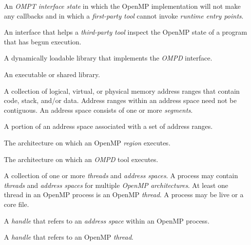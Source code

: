\glossarydefstart
An \emph{OMPT interface state} in which the OpenMP implementation will 
not make any callbacks and in which a \emph{first-party tool} cannot 
invoke \emph{runtime entry points}.
\glossarydefend

\glossarydefstart
An interface that helps a \emph{third-party tool} inspect the OpenMP state 
of a program that has begun execution.
\glossarydefend

\glossarydefstart
A dynamically loadable library that implements the \emph{OMPD} interface.
\glossarydefend

\glossarydefstart
An executable or shared library.
\glossarydefend

\glossarydefstart
A collection of logical, virtual, or physical memory address ranges 
that contain code, stack, and/or data. 
Address ranges within an address space need not be contiguous.  
An address space consists of one or more \emph{segments}.
\glossarydefend

\glossarydefstart
A portion of an address space associated with a set of address ranges.
\glossarydefend

\begin{comment}
\glossaryterm{architecture}
\glossarydefstart
A combination of the processor and the Application Binary Interface (ABI) used by
threads and address spaces.
\glossarydefend
\end{comment}

\glossarydefstart
The architecture on which an OpenMP \emph{region} executes.
\glossarydefend

\glossarydefstart
The architecture on which an \emph{OMPD} tool executes.
\glossarydefend

\glossarydefstart
A collection of one or more \emph{threads} and \emph{address spaces}. 
A process may contain \emph{threads} and \emph{address spaces} for 
multiple \emph{OpenMP architectures}. At least one thread in 
an OpenMP process is an OpenMP \emph{thread}.
A process may be live or a core file.
\glossarydefend

\glossarydefstart
A \emph{handle} that refers to an \emph{address space} within an OpenMP process.
\glossarydefend

\glossarydefstart
A \emph{handle} that refers to an OpenMP \emph{thread}.
\glossarydefend

